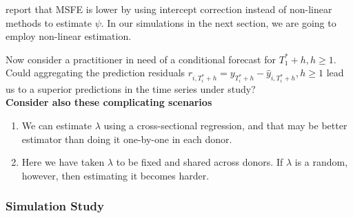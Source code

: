 \documentclass{uiucthesis2021}
\theoremstyle{definition}
\begin{document}
  \cite[][]{castle2011forecasting} report that MSFE is lower by using intercept correction instead of non-linear methods to estimate $\psi$.  In our simulations in the next section, we are going to employ non-linear estimation.
  
  Now consider a practitioner in need of a conditional forecast for $T_{1}^{*}+h, h\geq 1$.  Could aggregating the prediction residuals $r_{i,T_{i}^{*}+h} = y_{T_{i}^{*}+h}-\hat y_{i, T_{i}^{*}+h}, h\geq 1$ lead us to a superior predictions in the time series under study?\\
  
  \textbf{Consider also these complicating scenarios}
  \begin{enumerate}
    \item We can estimate $\lambda$ using a cross-sectional regression, and that may be better estimator than doing it one-by-one in each donor.
    \item Here we have taken $\lambda$ to be fixed and shared across donors.  If $\lambda$ is a random, however, then estimating it becomes harder.
  \end{enumerate}
  
  \subsubsection{Simulation Study}
  
\end{document}
